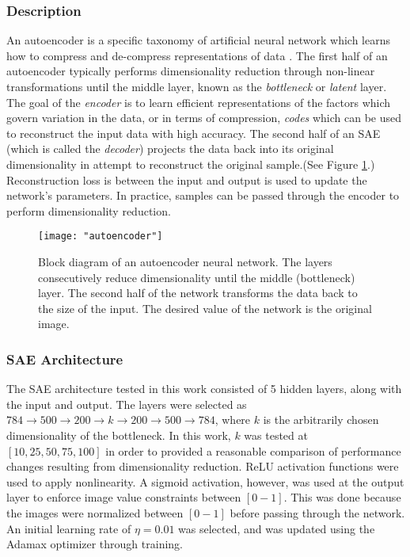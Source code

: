 \documentclass[conference]{IEEEtran}
\begin{document}
	 \subsubsection*{Description}
	 An autoencoder is a specific taxonomy of artificial neural network which learns how to  compress and de-compress representations of data \cite{Haykin2009NeuralNetworks,Goodfellow2016DeepLearning}. The first half of an autoencoder typically performs dimensionality reduction through non-linear transformations until the middle layer, known as the \textit{bottleneck} or \textit{latent} layer.  The goal of the \textit{encoder} is to learn efficient representations of the factors which govern variation in the data, or in terms of compression, \textit{codes} which can be used to reconstruct the input  data with high accuracy. The second half of an SAE (which is called the \textit{decoder}) projects the data back into its original dimensionality in attempt to reconstruct the original sample.(See Figure \ref{fig:autoencoder}.) Reconstruction loss is between the input and output is used to update the network's parameters.  In practice, samples can be passed through the encoder to perform dimensionality reduction. 
	 
	 \begin{center}
	  	\begin{figure}[t]
	  		\centering
	  		\texttt{[image: "autoencoder"]}
	  		\caption{Block diagram of an autoencoder neural network.  The layers consecutively reduce dimensionality until the middle (bottleneck) layer.  The second half of the network transforms the data back to the size of the input.  The desired value of the network is the original image.}
	  		\label{fig:autoencoder}
	  	\end{figure}
	  \end{center}

  
  	\subsubsection*{SAE Architecture}
  	The SAE architecture tested in this work consisted of 5 hidden layers, along with the input and output.  The layers were selected as $784 \rightarrow 500 \rightarrow 200 \rightarrow k \rightarrow 200 \rightarrow 500 \rightarrow 784$, where $k$ is the arbitrarily chosen dimensionality of the bottleneck.  In this work, $k$ was tested at $[10,25,50,75,100]$ in order to provided a reasonable comparison of performance changes resulting from dimensionality reduction.  ReLU activation functions were used to apply nonlinearity.  A sigmoid activation, however, was used at the output layer to enforce image value constraints between $[0-1]$.  This was done because the images were normalized between $[0-1]$ before passing through the network.  An initial learning rate of $\eta=0.01$ was selected, and was updated using the Adamax optimizer through training.
  	
\end{document}
